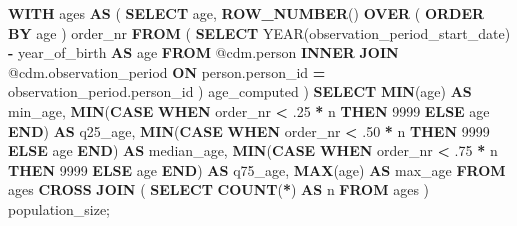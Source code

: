 \documentclass[
  11pt]{book}
\newenvironment{Shaded}{\begin{snugshade}}{\end{snugshade}}
\newcommand{\ControlFlowTok}[1]{\textcolor[rgb]{0.13,0.29,0.53}{\textbf{#1}}}
\newcommand{\DataTypeTok}[1]{\textcolor[rgb]{0.13,0.29,0.53}{#1}}
\newcommand{\DecValTok}[1]{\textcolor[rgb]{0.00,0.00,0.81}{#1}}
\newcommand{\FunctionTok}[1]{\textcolor[rgb]{0.13,0.29,0.53}{\textbf{#1}}}
\newcommand{\KeywordTok}[1]{\textcolor[rgb]{0.13,0.29,0.53}{\textbf{#1}}}
\newcommand{\NormalTok}[1]{#1}
\newcommand{\OperatorTok}[1]{\textcolor[rgb]{0.81,0.36,0.00}{\textbf{#1}}}
\theoremstyle{definition}
\theoremstyle{definition}
\theoremstyle{definition}
\theoremstyle{definition}
\theoremstyle{remark}
\begin{document}
\begin{Shaded}
\begin{Highlighting}[]
\KeywordTok{WITH}\NormalTok{ ages}
\KeywordTok{AS}\NormalTok{ (}
    \KeywordTok{SELECT}\NormalTok{ age,}
        \FunctionTok{ROW\_NUMBER}\NormalTok{() }\KeywordTok{OVER}\NormalTok{ (}
            \KeywordTok{ORDER} \KeywordTok{BY}\NormalTok{ age}
\NormalTok{            ) order\_nr}
    \KeywordTok{FROM}\NormalTok{ (}
        \KeywordTok{SELECT} \DataTypeTok{YEAR}\NormalTok{(observation\_period\_start\_date) }\OperatorTok{{-}}\NormalTok{ year\_of\_birth }\KeywordTok{AS}\NormalTok{ age}
        \KeywordTok{FROM}\NormalTok{ @cdm.person}
        \KeywordTok{INNER} \KeywordTok{JOIN}\NormalTok{ @cdm.observation\_period}
            \KeywordTok{ON}\NormalTok{ person.person\_id }\OperatorTok{=}\NormalTok{ observation\_period.person\_id}
\NormalTok{        ) age\_computed}
\NormalTok{    )}
\KeywordTok{SELECT} \FunctionTok{MIN}\NormalTok{(age) }\KeywordTok{AS}\NormalTok{ min\_age,}
    \FunctionTok{MIN}\NormalTok{(}\ControlFlowTok{CASE}
            \ControlFlowTok{WHEN}\NormalTok{ order\_nr }\OperatorTok{\textless{}}\NormalTok{ .}\DecValTok{25} \OperatorTok{*}\NormalTok{ n}
                \ControlFlowTok{THEN} \DecValTok{9999}
            \ControlFlowTok{ELSE}\NormalTok{ age}
            \ControlFlowTok{END}\NormalTok{) }\KeywordTok{AS}\NormalTok{ q25\_age,}
    \FunctionTok{MIN}\NormalTok{(}\ControlFlowTok{CASE}
            \ControlFlowTok{WHEN}\NormalTok{ order\_nr }\OperatorTok{\textless{}}\NormalTok{ .}\DecValTok{50} \OperatorTok{*}\NormalTok{ n}
                \ControlFlowTok{THEN} \DecValTok{9999}
            \ControlFlowTok{ELSE}\NormalTok{ age}
            \ControlFlowTok{END}\NormalTok{) }\KeywordTok{AS}\NormalTok{ median\_age,}
    \FunctionTok{MIN}\NormalTok{(}\ControlFlowTok{CASE}
            \ControlFlowTok{WHEN}\NormalTok{ order\_nr }\OperatorTok{\textless{}}\NormalTok{ .}\DecValTok{75} \OperatorTok{*}\NormalTok{ n}
                \ControlFlowTok{THEN} \DecValTok{9999}
            \ControlFlowTok{ELSE}\NormalTok{ age}
            \ControlFlowTok{END}\NormalTok{) }\KeywordTok{AS}\NormalTok{ q75\_age,}
    \FunctionTok{MAX}\NormalTok{(age) }\KeywordTok{AS}\NormalTok{ max\_age}
\KeywordTok{FROM}\NormalTok{ ages}
\KeywordTok{CROSS} \KeywordTok{JOIN}\NormalTok{ (}
    \KeywordTok{SELECT} \FunctionTok{COUNT}\NormalTok{(}\OperatorTok{*}\NormalTok{) }\KeywordTok{AS}\NormalTok{ n}
    \KeywordTok{FROM}\NormalTok{ ages}
\NormalTok{    ) population\_size;}
\end{Highlighting}
\end{Shaded}
\end{document}
